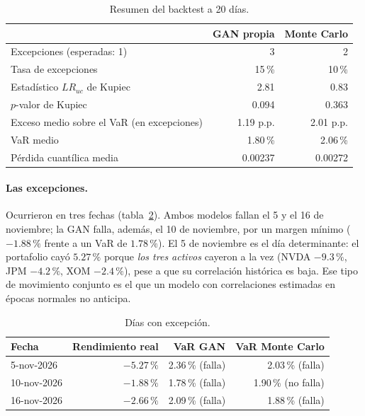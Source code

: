 \documentclass[12pt,letterpaper]{article}
\begin{document}
\begin{table}[H]
\centering
\renewcommand{\arraystretch}{1.2}
\begin{tabular}{@{}lrr@{}}
\toprule
 & \textbf{GAN propia} & \textbf{Monte Carlo}\\
\midrule
Excepciones (esperadas: 1) & 3 & 2\\
Tasa de excepciones & 15\,\% & 10\,\%\\
Estadístico $LR_{uc}$ de Kupiec & 2.81 & 0.83\\
$p$-valor de Kupiec & 0.094 & 0.363\\
Exceso medio sobre el VaR (en excepciones) & 1.19 p.p. & 2.01 p.p.\\
VaR medio & 1.80\,\% & 2.06\,\%\\
Pérdida cuantílica media & 0.00237 & 0.00272\\
\bottomrule
\end{tabular}
\caption{Resumen del backtest a 20 días.}\label{tab:bt}
\end{table}

\paragraph{Las excepciones.}
Ocurrieron en tres fechas (tabla~\ref{tab:exc}). Ambos modelos fallan el 5 y el 16 de noviembre; la GAN falla, además, el 10 de noviembre, por un margen mínimo ($-1.88\,\%$ frente a un VaR de $1.78\,\%$). El 5 de noviembre es el día determinante: el portafolio cayó $5.27\,\%$ porque \emph{los tres activos} cayeron a la vez (NVDA $-9.3\,\%$, JPM $-4.2\,\%$, XOM $-2.4\,\%$), pese a que su correlación histórica es baja. Ese tipo de movimiento conjunto es el que un modelo con correlaciones estimadas en épocas normales no anticipa.

\begin{table}[H]
\centering
\renewcommand{\arraystretch}{1.2}
\begin{tabular}{@{}lrrr@{}}
\toprule
\textbf{Fecha} & \textbf{Rendimiento real} & \textbf{VaR GAN} & \textbf{VaR Monte Carlo}\\
\midrule
5-nov-2026 & $-5.27\,\%$ & 2.36\,\% (falla) & 2.03\,\% (falla)\\
10-nov-2026 & $-1.88\,\%$ & 1.78\,\% (falla) & 1.90\,\% (no falla)\\
16-nov-2026 & $-2.66\,\%$ & 2.09\,\% (falla) & 1.88\,\% (falla)\\
\bottomrule
\end{tabular}
\caption{Días con excepción.}\label{tab:exc}
\end{table}
\end{document}
